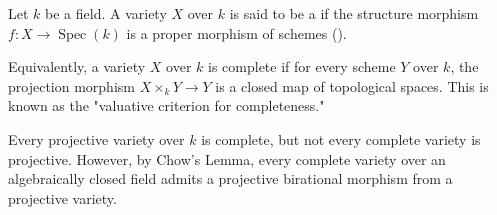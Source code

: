 \begin{definition} \label{definition:complete_variety_over_a_field}
Let $k$ be a field. A variety $X$ over $k$ is said to be a  if the structure morphism $f: X \to \operatorname{Spec}(k)$ is a proper morphism of schemes ().

Equivalently, a variety $X$ over $k$ is complete if for every scheme $Y$ over $k$, the projection morphism $X \times_k Y \to Y$ is a closed map of topological spaces. This is known as the "valuative criterion for completeness."

Every projective variety over $k$ is complete, but not every complete variety is projective. However, by Chow's Lemma, every complete variety over an algebraically closed field admits a projective birational morphism from a projective variety.
\end{definition}
